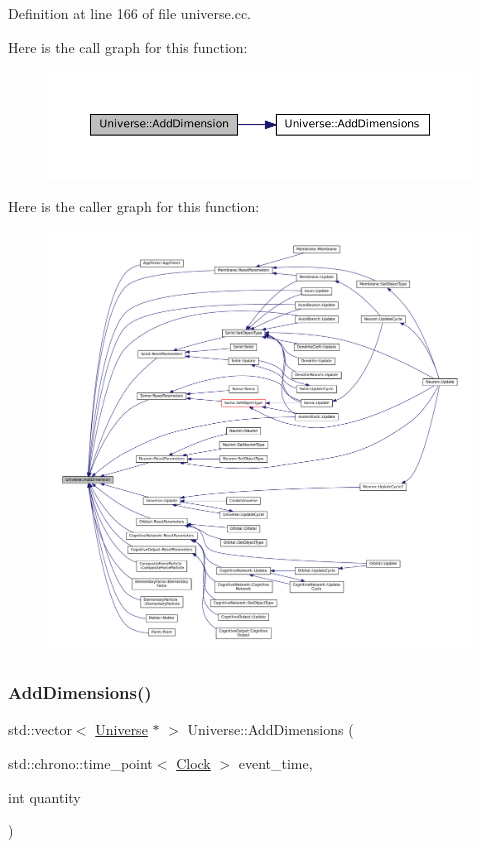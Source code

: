 Definition at line 166 of file universe.\+cc.

Here is the call graph for this function\+:\nopagebreak
\begin{figure}[H]
\begin{center}
\leavevmode
\includegraphics[width=350pt]{class_universe_a6326158c47bf3f7fe9297299a9b5b7b7_cgraph}
\end{center}
\end{figure}
Here is the caller graph for this function\+:\nopagebreak
\begin{figure}[H]
\begin{center}
\leavevmode
\includegraphics[width=350pt]{class_universe_a6326158c47bf3f7fe9297299a9b5b7b7_icgraph}
\end{center}
\end{figure}
\mbox{\label{class_universe_a03bdf5f7fea4209241e9bf5316d45517}} 
\subsubsection{\texorpdfstring{Add\+Dimensions()}{AddDimensions()}}
{\footnotesize\ttfamily std\+::vector$<$ \mbox{\hyperlink{class_universe}{Universe}} $\ast$ $>$ Universe\+::\+Add\+Dimensions (\begin{DoxyParamCaption}\item[{std\+::chrono\+::time\+\_\+point$<$ \mbox{\hyperlink{universe_8h_a0ef8d951d1ca5ab3cfaf7ab4c7a6fd80}{Clock}} $>$}]{event\+\_\+time,  }\item[{int}]{quantity }\end{DoxyParamCaption})}



